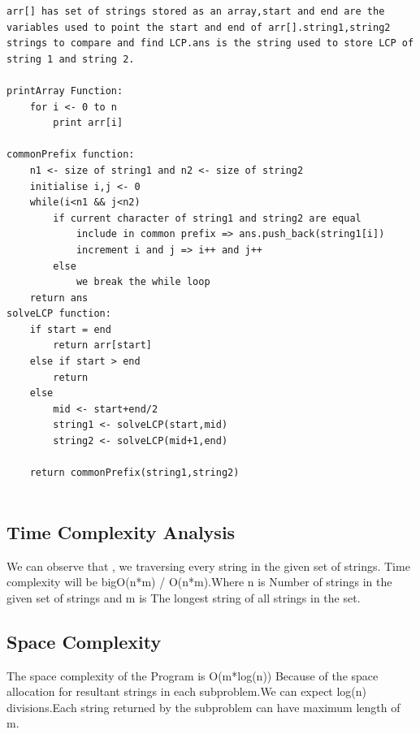 \documentclass{article}
\begin{document}
\begin{multicols}{2}
\begin{lstlisting}
arr[] has set of strings stored as an array,start and end are the variables used to point the start and end of arr[].string1,string2 strings to compare and find LCP.ans is the string used to store LCP of string 1 and string 2.

printArray Function:
    for i <- 0 to n
        print arr[i]

commonPrefix function:
    n1 <- size of string1 and n2 <- size of string2
    initialise i,j <- 0
    while(i<n1 && j<n2)
        if current character of string1 and string2 are equal
            include in common prefix => ans.push_back(string1[i])
            increment i and j => i++ and j++
        else 
            we break the while loop
    return ans
solveLCP function:
    if start = end 
        return arr[start]
    else if start > end
        return
    else 
        mid <- start+end/2
        string1 <- solveLCP(start,mid)
        string2 <- solveLCP(mid+1,end)
        
    return commonPrefix(string1,string2)
        
\end{lstlisting}

\subsection{Time Complexity Analysis}

We can observe that , we traversing every string in the given set of strings. Time complexity will be bigO(n*m) / O(n*m).Where n is Number of strings in the given set of strings and m is The longest string of all strings in the set.


\subsection{Space Complexity}

The space complexity of the Program is O(m*log(n)) Because of the space allocation for resultant strings in each subproblem.We can expect log(n) divisions.Each string returned by the subproblem can have maximum length of m.


\end{multicols}
\end{document}
